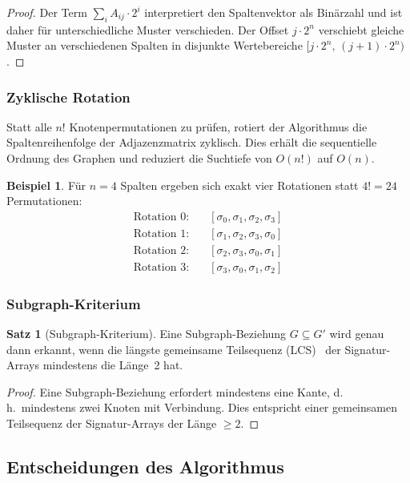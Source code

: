 \documentclass[a4paper,12pt]{article}
\theoremstyle{definition}
\newtheorem{beispiel}{Beispiel}
\newtheorem{satz}{Satz}
\begin{document}
\begin{proof}
Der Term $\sum_{i} A_{ij} \cdot 2^i$ interpretiert den Spaltenvektor als
Binärzahl und ist daher für unterschiedliche Muster verschieden. Der
Offset $j \cdot 2^n$ verschiebt gleiche Muster an verschiedenen Spalten
in disjunkte Wertebereiche $[j \cdot 2^n,\,(j+1)\cdot 2^n)$.
\end{proof}

\subsubsection{Zyklische Rotation}

Statt alle $n!$ Knotenpermutationen zu prüfen, rotiert der Algorithmus die
Spaltenreihenfolge der Adjazenzmatrix zyklisch. Dies erhält die sequentielle
Ordnung des Graphen und reduziert die Suchtiefe von $O(n!)$ auf $O(n)$.

\begin{beispiel}
Für $n = 4$ Spalten ergeben sich exakt vier Rotationen statt $4! = 24$
Permutationen:
\begin{align*}
\text{Rotation 0:} & \quad [\sigma_0, \sigma_1, \sigma_2, \sigma_3] \\
\text{Rotation 1:} & \quad [\sigma_1, \sigma_2, \sigma_3, \sigma_0] \\
\text{Rotation 2:} & \quad [\sigma_2, \sigma_3, \sigma_0, \sigma_1] \\
\text{Rotation 3:} & \quad [\sigma_3, \sigma_0, \sigma_1, \sigma_2]
\end{align*}
\end{beispiel}

\subsubsection{Subgraph-Kriterium}

\begin{satz}[Subgraph-Kriterium]
Eine Subgraph-Beziehung $G \subseteq G'$ wird genau dann erkannt, wenn
die längste gemeinsame Teilsequenz (LCS)~\cite{cormen} der Signatur-Arrays mindestens
die Länge~2 hat.
\end{satz}

\begin{proof}
Eine Subgraph-Beziehung erfordert mindestens eine Kante, d.\,h.\ mindestens
zwei Knoten mit Verbindung. Dies entspricht einer gemeinsamen Teilsequenz der
Signatur-Arrays der Länge $\geq 2$.
\end{proof}

\subsection{Entscheidungen des Algorithmus}
\end{document}

